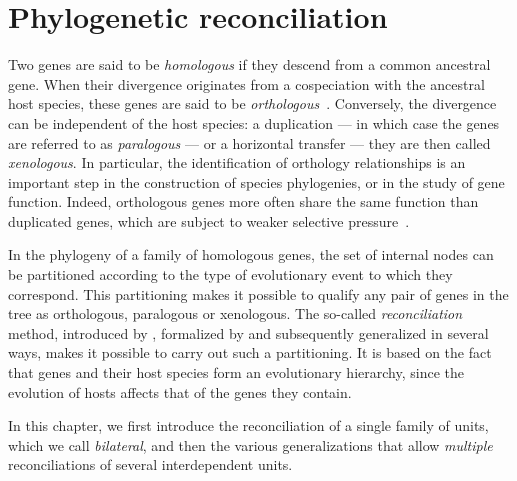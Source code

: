 \chapter{Phylogenetic reconciliation}\label{chap:reconciliation}

Two genes are said to be \emph{homologous} if they descend from a common ancestral gene.
When their divergence originates from a cospeciation with the ancestral host species, these genes are said to be \emph{orthologous}~\parencite{Fitch1970DistinguishingHomologousAnalogous}.
Conversely, the divergence can be independent of the host species: a duplication --- in which case the genes are referred to as \emph{paralogous} --- or a horizontal transfer --- they are then called \emph{xenologous}.
In particular, the identification of orthology relationships is an important step in the construction of species phylogenies, or in the study of gene function.
Indeed, orthologous genes more often share the same function than duplicated genes, which are subject to weaker selective pressure~\parencite{Lynch2001ProbabilityPreservationNewly}.

In the phylogeny of a family of homologous genes, the set of internal nodes can be partitioned according to the type of evolutionary event to which they correspond.
This partitioning makes it possible to qualify any pair of genes in the tree as orthologous, paralogous or xenologous.
The so-called \emph{reconciliation} method, introduced by \textcite{Goodman1979FittingGeneLineage}, formalized by \textcite{Page1994MapsTreesCladistic} and subsequently generalized in several ways, makes it possible to carry out such a partitioning.
It is based on the fact that genes and their host species form an evolutionary hierarchy, since the evolution of hosts affects that of the genes they contain.

In this chapter, we first introduce the reconciliation of a single family of units, which we call \emph{bilateral}, and then the various generalizations that allow \emph{multiple} reconciliations of several interdependent units.




